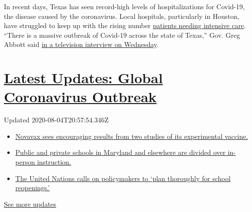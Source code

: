 In recent days, Texas has seen record-high levels of hospitalizations
for Covid-19, the disease caused by the coronavirus. Local hospitals,
particularly in Houston, have struggled to keep up with the rising
number
\href{https://www.texastribune.org/2020/06/23/texas-coronavirus-hospitalizations-icu-houston/}{patients
needing intensive care}. ``There is a massive outbreak of Covid-19
across the state of Texas,'' Gov. Greg Abbott said
\href{https://dfw.cbslocal.com/2020/06/24/gov-greg-abbott-says-texas-massive-covid-19-outbreak}{in
a television interview on Wednesday}.

\hypertarget{latest-updates-global-coronavirus-outbreak}{%
\section{\texorpdfstring{\href{https://www.nytimes.com/2020/08/04/world/coronavirus-cases.html?action=click\&pgtype=Article\&state=default\&region=MAIN_CONTENT_1\&context=storylines_live_updates}{Latest
Updates: Global Coronavirus
Outbreak}}{Latest Updates: Global Coronavirus Outbreak}}\label{latest-updates-global-coronavirus-outbreak}}

Updated 2020-08-04T20:57:54.346Z

\begin{itemize}
\tightlist
\item
  \href{https://www.nytimes.com/2020/08/04/world/coronavirus-cases.html?action=click\&pgtype=Article\&state=default\&region=MAIN_CONTENT_1\&context=storylines_live_updates\#link-1228a480}{Novavax
  sees encouraging results from two studies of its experimental
  vaccine.}
\item
  \href{https://www.nytimes.com/2020/08/04/world/coronavirus-cases.html?action=click\&pgtype=Article\&state=default\&region=MAIN_CONTENT_1\&context=storylines_live_updates\#link-4825b93}{Public
  and private schools in Maryland and elsewhere are divided over
  in-person instruction.}
\item
  \href{https://www.nytimes.com/2020/08/04/world/coronavirus-cases.html?action=click\&pgtype=Article\&state=default\&region=MAIN_CONTENT_1\&context=storylines_live_updates\#link-50f7386d}{The
  United Nations calls on policymakers to `plan thoroughly for school
  reopenings.'}
\end{itemize}

\href{https://www.nytimes.com/2020/08/04/world/coronavirus-cases.html?action=click\&pgtype=Article\&state=default\&region=MAIN_CONTENT_1\&context=storylines_live_updates}{See
more updates}

